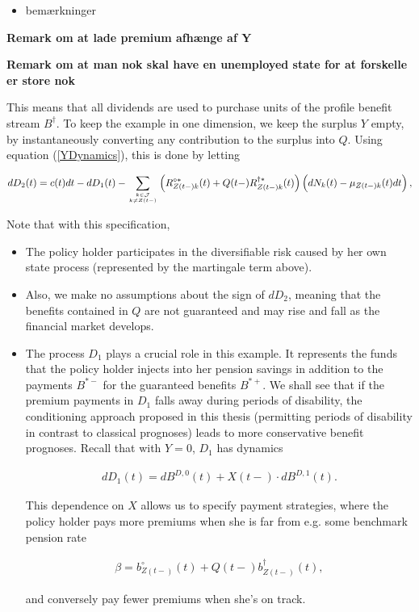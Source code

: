 \documentclass{book}
\newcommand{\1}[1]{\mathbbm{1}_{\left\lbrace #1 \right\rbrace}}
\theoremstyle{break}
\theoremstyle{remark}
\numberwithin{equation}{section}
\begin{document}
\begin{itemize}
	\item bemærkninger
\end{itemize}

\textbf{Remark om at lade premium afhænge af Y}

\textbf{Remark om at man nok skal have en unemployed state for at forskelle er store nok}

This means that all dividends are used to purchase units of the profile benefit stream $B^\dagger$. To keep the example in one dimension, we keep the surplus $Y$ empty, by instantaneously converting any contribution to the surplus into $Q$. Using equation (\ref{YDynamics}), this is done by letting

\begin{align*}
	dD_2(t) = c(t)dt - dD_1(t) - \sum_{k \in \mathcal{J} \atop k \neq Z(t-)} \left( R_{Z(t-)k}^{\circ*}(t) + Q(t-) R_{Z(t-)k}^{\dagger*}(t) \right) \left( dN_k(t) - \mu_{Z(t-)k}(t) dt \right),
\end{align*}

Note that with this specification,

\begin{itemize}
	\item The policy holder participates in the diversifiable risk caused by her own state process (represented by the martingale term above).
	\item Also, we make no assumptions about the sign of $dD_2$, meaning that the benefits contained in $Q$ are not guaranteed and may rise and fall as the financial market develops.
	\item The process $D_1$ plays a crucial role in this example. It represents the funds that the policy holder injects into her pension savings in addition to the payments $B^{*-}$ for the guaranteed benefits $B^{*+}$. We shall see that if the premium payments in $D_1$ falls away during periods of disability, the conditioning approach proposed in this thesis (permitting periods of disability in contrast to classical prognoses) leads to more conservative benefit prognoses. Recall that with $Y=0$, $D_1$ has dynamics
	
	\begin{align*}
		dD_1(t) = dB^{D,0}(t) + X(t-) \cdot dB^{D,1}(t).
	\end{align*}

	This dependence on $X$ allows us to specify payment strategies, where the policy holder pays more premiums when she is far from e.g. some benchmark pension rate
	
	
	\begin{align*}
		\beta = b_{Z(t-)}^\circ(t) + Q(t-) b_{Z(t-)}^\dagger(t),
	\end{align*}
	
	and conversely pay fewer premiums when she's on track.
\end{itemize}
\end{document}
